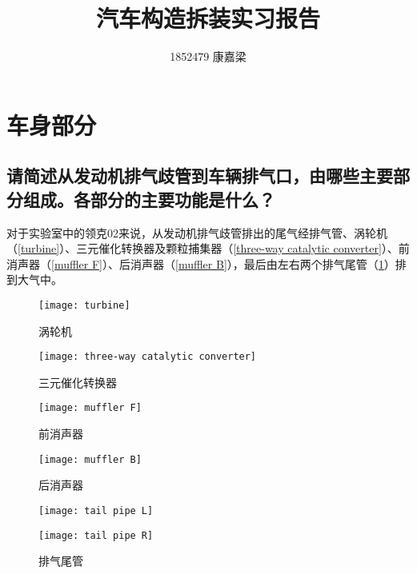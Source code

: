 \documentclass[UTF8]{ctexart}
\title{汽车构造拆装实习报告}
\author{1852479 康嘉梁}
\date{}
\numberwithin{figure}{section}
\numberwithin{table}{section}
\begin{document}
\maketitle

\section{车身部分}
\subsection{请简述从发动机排气歧管到车辆排气口，由哪些主要部分组成。各部分的主要功能是什么？}

\label{subsection:1.1}

对于实验室中的领克02来说，从发动机排气歧管排出的尾气经排气管、涡轮机（\cref{turbine}）、三元催化转换器及颗粒捕集器（\cref{three-way catalytic converter}）、前消声器（\cref{muffler F}）、后消声器（\cref{muffler B}），最后由左右两个排气尾管（\cref{tail pipe}）排到大气中。

\begin{figure}[htbp]
	\centering
	\begin{minipage}[b]{0.3\textwidth}
		\centering
		\texttt{[image: turbine]}
		\caption{涡轮机}
		\label{turbine}
	\end{minipage}
	\begin{minipage}[b]{0.4\textwidth}
		\centering
		\texttt{[image: three-way catalytic converter]}
		\caption{三元催化转换器}
		\label{three-way catalytic converter}
	\end{minipage}
	\begin{minipage}[b]{0.25\textwidth}
		\centering
		\texttt{[image: muffler F]}
		\caption{前消声器}
		\label{muffler F}
	\end{minipage}
	\begin{minipage}[b]{0.55\textwidth}
		\centering
		\texttt{[image: muffler B]}
		\caption{后消声器}
		\label{muffler B}
	\end{minipage}
	\begin{minipage}[b]{0.4\textwidth}
		\centering
		\begin{minipage}[b]{0.45\textwidth}
			\centering
			\texttt{[image: tail pipe L]}
		\end{minipage}
		\begin{minipage}[b]{0.45\textwidth}
			\centering
			\texttt{[image: tail pipe R]}
		\end{minipage}
		\caption{排气尾管}
		\label{tail pipe}
	\end{minipage}
\end{figure}
\end{document}
